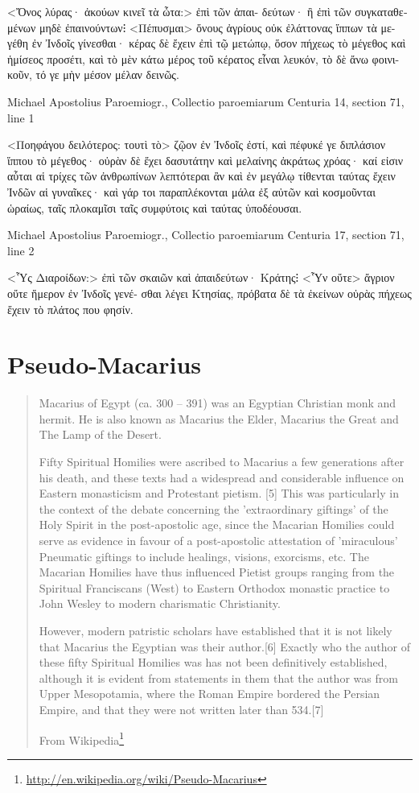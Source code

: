 \documentclass[12pt,letterpaper,twoside,final]{memoir}
\begin{document}
\begin{greek}
<Ὄνος λύρας· ἀκούων κινεῖ τὰ ὦτα:> ἐπὶ τῶν ἀπαι-
δεύτων· ἢ ἐπὶ τῶν συγκαταθεμένων μηδὲ ἐπαινούντων⁝ 
<Πέπυσμαι> ὄνους ἀγρίους οὐκ ἐλάττονας ἵππων τὰ με-  
γέθη ἐν Ἰνδοῖς γίνεσθαι· κέρας δὲ ἔχειν ἐπὶ τῷ μετώπῳ, 
ὅσον πήχεως τὸ μέγεθος καὶ ἡμίσεος προσέτι, καὶ τὸ μὲν 
κάτω μέρος τοῦ κέρατος εἶναι λευκόν, τὸ δὲ ἄνω φοινι-
κοῦν, τό γε μὴν μέσον μέλαν δεινῶς. 



Michael Apostolius Paroemiogr., Collectio paroemiarum 
Centuria 14, section 71, line 1

<Ποηφάγου δειλότερος: τουτὶ τὸ> ζῷον ἐν Ἰνδοῖς 
ἐστί, καὶ πέφυκέ γε διπλάσιον ἵππου τὸ μέγεθος· οὐρὰν 
δὲ ἔχει δασυτάτην καὶ μελαίνης ἀκράτως χρόας· καί εἰσιν 
αὗται αἱ τρίχες τῶν ἀνθρωπίνων λεπτότεραι ἂν καὶ ἐν 
μεγάλῳ τίθενται ταύτας ἔχειν Ἰνδῶν αἱ γυναῖκες· καὶ γάρ 
τοι παραπλέκονται μάλα ἐξ αὐτῶν καὶ κοσμοῦνται ὡραίως, 
ταῖς πλοκαμῖσι ταῖς συμφύτοις καὶ ταύτας ὑποδέουσαι. 



Michael Apostolius Paroemiogr., Collectio paroemiarum 
Centuria 17, section 71, line 2

<Ὗς Διαροίδων:> ἐπὶ τῶν σκαιῶν καὶ ἀπαιδεύτων· 
Κράτης⁝ <Ὗν οὔτε> ἄγριον οὔτε ἥμερον ἐν Ἰνδοῖς γενέ-
σθαι λέγει Κτησίας, πρόβατα δὲ τὰ ἐκείνων οὐρὰς πήχεως 
ἔχειν τὸ πλάτος που φησίν. 


\end{greek}

\section{Pseudo-Macarius}
\blockquote[From Wikipedia\footnote{\url{http://en.wikipedia.org/wiki/Pseudo-Macarius}}]{Macarius of Egypt (ca. 300 – 391) was an Egyptian Christian monk and hermit. He is also known as Macarius the Elder, Macarius the Great and The Lamp of the Desert.

Fifty Spiritual Homilies were ascribed to Macarius a few generations after his death, and these texts had a widespread and considerable influence on Eastern monasticism and Protestant pietism. [5] This was particularly in the context of the debate concerning the 'extraordinary giftings' of the Holy Spirit in the post-apostolic age, since the Macarian Homilies could serve as evidence in favour of a post-apostolic attestation of 'miraculous' Pneumatic giftings to include healings, visions, exorcisms, etc. The Macarian Homilies have thus influenced Pietist groups ranging from the Spiritual Franciscans (West) to Eastern Orthodox monastic practice to John Wesley to modern charismatic Christianity.

However, modern patristic scholars have established that it is not likely that Macarius the Egyptian was their author.[6] Exactly who the author of these fifty Spiritual Homilies was has not been definitively established, although it is evident from statements in them that the author was from Upper Mesopotamia, where the Roman Empire bordered the Persian Empire, and that they were not written later than 534.[7]}
\end{document}
